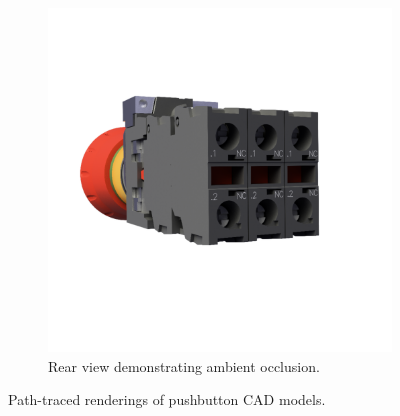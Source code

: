 \begin{figure}[H]
\begin{subfigure}[t]{0.4\textwidth}
        \includegraphics[width=\textwidth]{resources/demo-ambient-occlusion.png}
        \caption{Rear view demonstrating ambient occlusion.}
        \label{fig:demo-ambient-occlusion}
    \end{subfigure}
    \hspace*{1cm}
    \caption{Path-traced renderings of pushbutton \gls{CAD} models.}
    \label{fig:rendering-showcase}
\end{figure}
